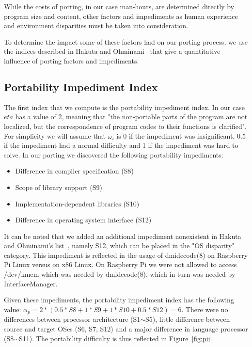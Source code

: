 While the costs of porting, in our case man-hours, are determined directly by
program size and content, other factors and impediments as human experience and
environment disparities must be taken into consideration.

To determine the impact some of these factors had on our porting process, we
use the indices described in Hakuta and Ohminami~\cite{hakuta} that give
a quantitative influence of porting factors and impediments.

\subsection{Portability Impediment Index}

The first index that we compute is the portability impediment index. In our
case $eta$ has a value of 2, meaning that "the non-portable parts of the program
are not localized, but the correspondence of program codes to their functions is
clarified". For simplicity we will assume that $\omega_i$ is 0 if the impediment
was insignificant, 0.5 if the impediment had a normal difficulty and 1 if the
impediment was hard to solve. In our porting we discovered the following
portability impediments:
\begin{itemize}
    \item Difference in compiler specification (S8)
    \item Scope of library support (S9)
    \item Implementation-dependent libraries (S10)
    \item Difference in operating system interface (S12)
\end{itemize}

It can be noted that we added an additional impediment nonexistent in Hakuta and
Ohminami's list~\cite{hakuta}, namely S12, which can be placed in the "OS disparity"
category. This impediment is reflected in the usage of dmidecode(8) on Raspberry
Pi Linux versus on x86 Linux. On Raspberry Pi we were not allowed to access
/dev/kmem which was needed by dmidecode(8), which in turn was needed by
InterfaceManager.

Given these impediments, the portability impediment index has the following
value: $\alpha_p = 2 * (0.5 * S8 + 1 * S9 + 1 * S10 + 0.5 * S12) = 6$.  There
were no differences between processor architecture (S1$\sim$S5), little difference
between source and target OSes (S6, S7, S12) and a major difference in language
processor (S8$\sim$S11). The portability difficulty is thus reflected in
Figure~\ref{fig:pii}.

